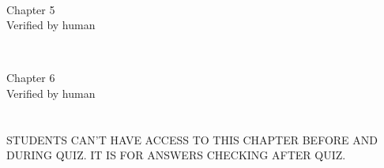 \documentclass{report}
\begin{document}
\begin{flushleft}
\begin{minipage}{\linewidth}
\begin{enumerate}
	
		
\end{enumerate}
\blank[width=\linewidth]{}~\\
\end{minipage}

\begin{minipage}{\linewidth}
\begin{center}
Chapter 5\\
Verified by human\\
\end{center}




\blank[width=\linewidth]{}~\\
\end{minipage}

\begin{minipage}{\linewidth}
\begin{center}
Chapter 6\\
Verified by human\\
\end{center}
\hspace{22pt}
\end{minipage}
\end{flushleft}

\chapter{}
STUDENTS CAN'T HAVE ACCESS TO THIS CHAPTER BEFORE AND DURING QUIZ. IT IS FOR ANSWERS CHECKING AFTER QUIZ.\\\\
\printsolutions
\end{document}
